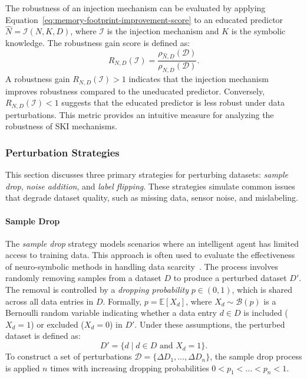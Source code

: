 %
The robustness of an injection mechanism can be evaluated by applying Equation~\eqref{eq:memory-footprint-improvement-score} to an educated predictor \(\hat{N} = \mathcal{I}(N, K, D)\), where \(\mathcal{I}\) is the injection mechanism and \(K\) is the symbolic knowledge.
%
The robustness gain score is defined as:
%
\begin{equation}
    \label{eq:robustness-gain}
    R_{N, D}(\mathcal{I}) = \frac{\rho_{\hat{N}, D}(\mathcal{D})}{\rho_{N, D}(\mathcal{D})}.
\end{equation}
%
A robustness gain \(R_{N, D}(\mathcal{I}) > 1\) indicates that the injection mechanism improves robustness compared to the uneducated predictor.
%
Conversely, \(R_{N, D}(\mathcal{I}) < 1\) suggests that the educated predictor is less robust under data perturbations.
%
This metric provides an intuitive measure for analyzing the robustness of \gls{SKI} mechanisms.


\subsubsection{Perturbation Strategies}\label{subsubsec:perturbation-strategies}
%
This section discusses three primary strategies for perturbing datasets: \emph{sample drop}, \emph{noise addition}, and \emph{label flipping}.
%
These strategies simulate common issues that degrade dataset quality, such as missing data, sensor noise, and mislabeling.

%
\paragraph{Sample Drop}
%
The \emph{sample drop} strategy models scenarios where an intelligent agent has limited access to training data.
%
This approach is often used to evaluate the effectiveness of neuro-symbolic methods in handling data scarcity~\cite{xu2018semantic}.
%
The process involves randomly removing samples from a dataset \(D\) to produce a perturbed dataset \(D'\).
%
The removal is controlled by a \emph{dropping probability} \(p \in (0, 1)\), which is shared across all data entries in \(D\).
%
Formally, \(p = \mathbb{E}[X_d]\), where \(X_d \sim \mathcal{B}(p)\) is a Bernoulli random variable indicating whether a data entry \(d \in D\) is included (\(X_d = 1\)) or excluded (\(X_d = 0\)) in \(D'\).
%
Under these assumptions, the perturbed dataset is defined as:
%
\[
D' = \{d \mid d \in D \text{ and } X_d = 1\}.
\]
%
To construct a set of perturbations \(\mathcal{D} = \{\Delta D_1, \ldots, \Delta D_n\}\), the sample drop process is applied \(n\) times with increasing dropping probabilities \(0 < p_1 < \ldots < p_n < 1\).

